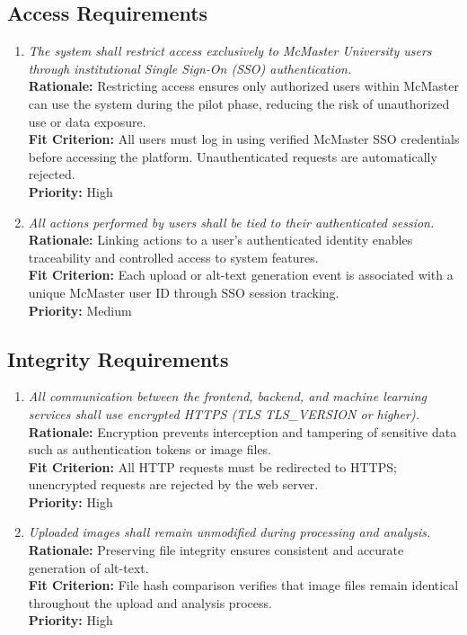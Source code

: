 \documentclass[12pt]{article}
\begin{document}
\subsection{Access Requirements}
\begin{enumerate}[label=SR-AR \arabic*., wide=0pt, leftmargin=*]
\item \emph{The system shall restrict access exclusively to McMaster University users through institutional Single Sign-On (SSO) authentication.}\\[2mm] 
    {\bf Rationale:} Restricting access ensures only authorized users within McMaster can use the system during the pilot phase, reducing the risk of unauthorized use or data exposure.\\
    {\bf Fit Criterion:} All users must log in using verified McMaster SSO credentials before accessing the platform. Unauthenticated requests are automatically rejected.\\
    {\bf Priority:} High

\item \emph{All actions performed by users shall be tied to their authenticated session.}\\[2mm] 
    {\bf Rationale:} Linking actions to a user’s authenticated identity enables traceability and controlled access to system features.\\
    {\bf Fit Criterion:} Each upload or alt-text generation event is associated with a unique McMaster user ID through SSO session tracking.\\
    {\bf Priority:} Medium
\end{enumerate}

\subsection{Integrity Requirements}
\begin{enumerate}[label=SR-IR \arabic*., wide=0pt, leftmargin=*]
\item \emph{All communication between the frontend, backend, and machine learning services shall use encrypted HTTPS (TLS TLS\_VERSION or higher).}\\[2mm] 
    {\bf Rationale:} Encryption prevents interception and tampering of sensitive data such as authentication tokens or image files.\\
    {\bf Fit Criterion:} All HTTP requests must be redirected to HTTPS; unencrypted requests are rejected by the web server.\\
    {\bf Priority:} High

\item \emph{Uploaded images shall remain unmodified during processing and analysis.}\\[2mm] 
    {\bf Rationale:} Preserving file integrity ensures consistent and accurate generation of alt-text.\\
    {\bf Fit Criterion:} File hash comparison verifies that image files remain identical throughout the upload and analysis process.\\
    {\bf Priority:} High
\end{enumerate}
\end{document}
